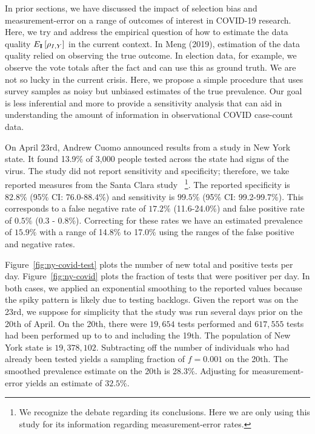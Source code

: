 \documentclass[aoas]{amsart}
\def\I{\bf I}
\begin{document}
In prior sections, we have discussed the impact of selection bias and measurement-error on a range of outcomes of interest in COVID-19 research.  Here, we try and address the empirical question of how to estimate the data quality $E_{\I} \left[ \rho_{I,Y} \right]$ in the current context.
In Meng (2019), estimation of the data quality relied on observing the true outcome.  In election data, for example, we observe the vote totals after the fact and can use this as ground truth.  We are not so lucky in the current crisis.  Here, we propose a simple procedure that uses survey samples as noisy but unbiased estimates of the true prevalence. Our goal is less inferential and more to provide a sensitivity analysis that can aid in understanding the amount of information in observational COVID case-count data.

On April 23rd, Andrew Cuomo announced results from a study in New York state.  It found 13.9\% of 3,000 people tested across the state had signs of the virus.  The study did not report sensitivity and specificity; therefore, we take reported measures from the Santa Clara study~\citep{Bendavid2020} \footnote{We recognize the debate regarding its conclusions.  Here we are only using this study for its information regarding measurement-error rates.}.  The reported specificity is $82.8\%$ (95\% CI: 76.0-88.4\%) and sensitivity is $99.5\%$ (95\% CI: 99.2-99.7\%).  This corresponds to a false negative rate of $17.2\%$ (11.6-24.0\%) and false positive rate of $0.5\%$ (0.3 - 0.8\%).  Correcting for these rates we have an estimated prevalence of $15.9\%$ with a range of 14.8\% to 17.0\% using the ranges of the false positive and negative rates.

Figure~\ref{fig:ny-covid-test} plots the number of new total and positive tests per day.  Figure~\ref{fig:ny-covid} plots the fraction of tests that were positiver per day.  In both cases, we applied an exponential smoothing to the reported values because the spiky pattern is likely due to testing backlogs.  Given the report was on the 23rd, we suppose for simplicity that the study was run several days prior on the 20th of April. On the 20th, there were $19,654$ tests performed and $617,555$ tests had been performed up to to and including the 19th. The population of New York state is $19,378,102$.   Subtracting off the number of individuals who had already been tested yields a sampling fraction of $f = 0.001$ on the 20th.  The smoothed prevalence estimate on the 20th is 28.3\%.  Adjusting for measurement-error yields an estimate of $32.5\%$.
\end{document}
